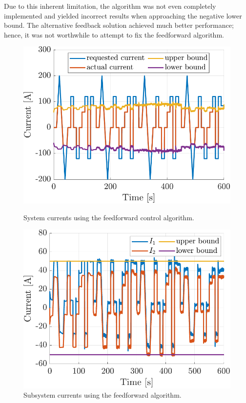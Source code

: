 Due to this inherent limitation, the algorithm was not even completely implemented and yielded incorrect results when approaching the negative lower bound. The alternative feedback solution achieved much better performance; hence, it was not worthwhile to attempt to fix the feedforward algorithm. 

\begin{figure}
\centering
\begin{minipage}{0.49\textwidth}
    \centering
    \includegraphics[width=\linewidth]{figures/13/ff-system.pdf}
    \caption{System currents using the feedforward control algorithm.}
    \label{fig:13-ff-system}
\end{minipage}
\hfill
\begin{minipage}{0.49\textwidth}
    \centering
    \includegraphics[width=\linewidth]{figures/13/ff-subsystem.pdf}
    \caption{Subsystem currents using the feedforward algorithm.}
    \label{fig:13-ff-subsystem}
\end{minipage}
\end{figure}

